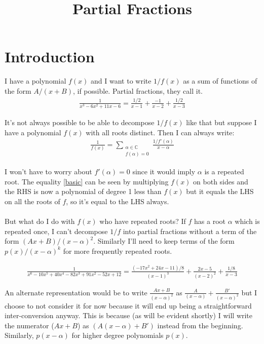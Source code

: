\documentclass{article}
\author{\vspace{-5ex}}
\title{Partial Fractions}
\date{\vspace{-5ex}}
\begin{document}
\maketitle

\section*{Introduction}
I have a polynomial $f(x)$ and I want to write $1/f(x)$ as a sum of functions of the form $A/(x+B)$, if possible. Partial fractions, they call it.
\begin{align}
    \frac{1}{x^3 - 6x^2 + 11x - 6} = \frac{1/2}{x-1} + \frac{-1}{x-2} + \frac{1/2}{x-3}
\end{align}

It's not always possible to be able to decompose $1/f(x)$ like that but suppose I have a polynomial $f(x)$ with all roots distinct. Then I can always write:
\begin{align}
    \frac{1}{f(x)} = \sum_{\substack{\alpha \in \mathbb{C} \\ f(\alpha) = 0}} \frac{1/f'(\alpha)}{x-\alpha} \label{basic}
\end{align}

I won't have to worry about $f'(\alpha) = 0$ since it would imply $\alpha$ is a repeated root. The equality \eqref{basic} can be seen by multiplying $f(x)$ on both sides and the RHS is now a polynomial of degree 1 less than $f(x)$ but it equals the LHS on all the roots of $f$, so it's equal to the LHS always.
\\\\
But what do I do with $f(x)$ who have repeated roots? If $f$ has a root $\alpha$ which is repeated once, I can't decompose $1/f$ into partial fractions without a term of the form $(Ax+B)/(x-\alpha)^2$. Similarly I'll need to keep terms of the form $p(x)/(x-\alpha)^k$ for more frequently repeated roots.

\begin{align}
    \frac{1}{x^6 - 10 x^5 + 40 x^4 - 82 x^3 + 91 x^2 - 52 x + 12} = \frac{(-17x^2+24x-11)/8}{(x-1)^3} + \frac{2x-5}{(x-2)^2} + \frac{1/8}{x-3}
\end{align}

\begin{tcolorbox}An alternate representation would be to write $\frac{Ax+B}{(x-\alpha)^2}$ as $\frac{A}{(x-\alpha)} + \frac{B'}{(x-\alpha)^2}$ but I choose to not consider it for now because it will end up being a straightforward inter-conversion anyway. This is because (as will be evident shortly) I will write the numerator ($Ax+B$) as $(A(x-\alpha) + B')$ instead from the beginning. Similarly, $p(x-\alpha)$ for higher degree polynomials $p(x)$.
\end{tcolorbox}
\end{document}
